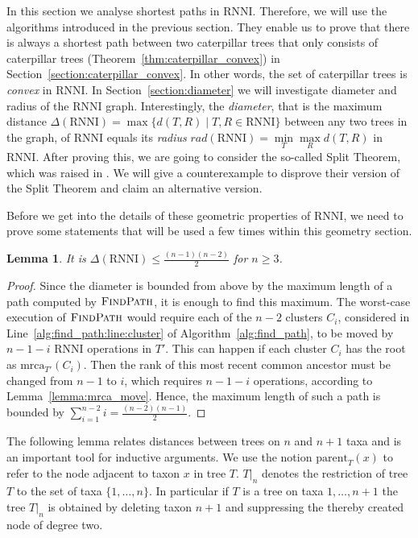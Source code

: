 \documentclass{amsart}
\newcommand{\parent}{\mathrm{parent}}
\newcommand{\mrca}{\mathrm{mrca}}
\newcommand{\rnni}{\mathrm{RNNI}}
\newcommand{\findpath}{\textsc{FindPath}}
\newtheorem{lemma}[definition]{Lemma}
\begin{document}
In this section we analyse shortest paths in $\rnni$.
Therefore, we will use the algorithms introduced in the previous section.
They enable us to prove that there is always a shortest path between two caterpillar trees that only consists of caterpillar trees (Theorem~\ref{thm:caterpillar_convex}) in Section~\ref{section:caterpillar_convex}.
In other words, the set of caterpillar trees is \emph{convex} in $\rnni$.
In Section~\ref{section:diameter} we will investigate diameter and radius of the $\rnni$ graph.
Interestingly, the \emph{diameter}, that is the maximum distance $\Delta(\rnni) = \max \{d(T, R) \mid T, R \in \rnni\}$ between any two trees in the graph, of $\rnni$ equals its \emph{radius} $rad(\rnni) = \min\limits_T \max\limits_R d(T,R)$ in $\rnni$.
After proving this, we are going to consider the so-called Split Theorem, which was raised in \autocite{Gavryushkin2018-ol}.
We will give a counterexample to disprove their version of the Split Theorem and claim an alternative version.

Before we get into the details of these geometric properties of $\rnni$, we need to prove some statements that will be used a few times within this geometry section.

\begin{lemma}
It is $\Delta(\rnni) \leq \frac{(n-1)(n-2)}{2}$ for $n \geq 3$.
\label{lemma:diameter_bound}
\end{lemma}

\begin{proof}
Since the diameter is bounded from above by the maximum length of a path computed by $\findpath$, it is enough to find this maximum.
The worst-case execution of $\findpath$ would require each of the $n-2$ clusters $C_i$, considered in Line~\ref{alg:find_path:line:cluster} of Algorithm~\ref{alg:find_path}, to be moved by $n-1-i$ $\rnni$ operations in $T'$.
This can happen if each cluster $C_i$ has the root as $\mrca_{T'}(C_i)$.
Then the rank of this most recent common ancestor must be changed from $n-1$ to $i$, which requires $n-1-i$ operations, according to Lemma~\ref{lemma:mrca_move}.
Hence, the maximum length of such a path is bounded by $\sum\limits_{i = 1}^{n-2} i = \frac{(n-2)(n-1)}{2}$.
\end{proof}

The following lemma relates distances between trees on $n$ and $n+1$ taxa and is an important tool for inductive arguments.
We use the notion $\parent_T(x)$ to refer to the node adjacent to taxon $x$ in tree $T$.
$T{\big|}_n$ denotes the restriction of tree $T$ to the set of taxa $\{1, \ldots, n\}$.
In particular if $T$ is a tree on taxa $1, \ldots, n+1$ the tree $T{\big|}_n$ is obtained by deleting taxon $n+1$ and suppressing the thereby created node of degree two.
\end{document}
